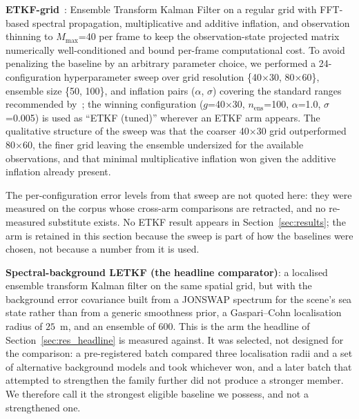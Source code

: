 \documentclass[review]{elsarticle}
\begin{document}
\textbf{ETKF-grid}~\citep{desmars2020}: Ensemble Transform Kalman Filter
on a regular grid with FFT-based spectral propagation, multiplicative
and additive inflation, and observation thinning to $M_{\max}$=40 per frame to keep the
observation-state projected matrix numerically well-conditioned
and bound per-frame computational cost.  To avoid penalizing the baseline by an arbitrary parameter
choice, we performed a 24-configuration hyperparameter sweep over grid
resolution \{40$\times$30, 80$\times$60\}, ensemble size \{50, 100\},
and inflation pairs ($\alpha$, $\sigma$) covering the standard ranges
recommended by~\citet{desmars2020}; the winning configuration
($g$=40$\times$30, $n_{\text{ens}}$=100, $\alpha$=1.0, $\sigma$=0.005) is used as
``ETKF (tuned)'' wherever an ETKF arm appears. The qualitative structure of the
sweep was that the coarser 40$\times$30 grid outperformed 80$\times$60, the finer
grid leaving the ensemble undersized for the available observations, and that
minimal multiplicative inflation won given the additive inflation already
present.

The per-configuration error levels from that sweep are not quoted here: they were
measured on the corpus whose cross-arm comparisons are retracted, and no re-measured
substitute exists. No ETKF result appears in Section~\ref{sec:results}; the arm is
retained in this section because the sweep is part of how the baselines were chosen,
not because a number from it is used.

\textbf{Spectral-background LETKF (the headline comparator)}: a localised ensemble
transform Kalman filter on the same spatial grid, but with the background error
covariance built from a JONSWAP spectrum for the scene's sea state rather than from
a generic smoothness prior, a Gaspari--Cohn localisation radius of $25$~m, and an
ensemble of $600$. This is the arm the headline of Section~\ref{sec:res_headline}
is measured against. It was selected, not designed for the comparison: a
pre-registered batch compared three localisation radii and a set of alternative
background models and took whichever won, and a later batch that attempted to
strengthen the family further did not produce a stronger member. We therefore call
it the strongest eligible baseline we possess, and not a strengthened one.
\end{document}
